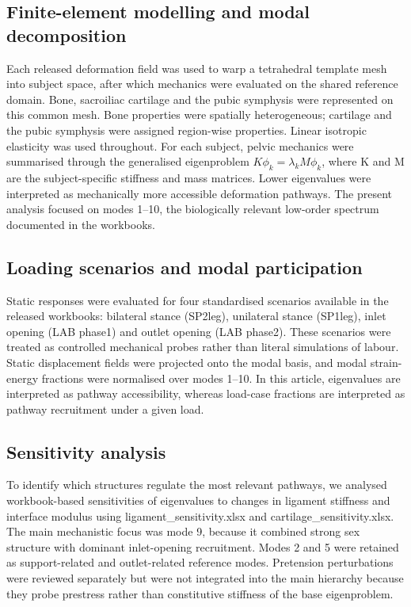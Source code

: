 \documentclass[openacc]{rsproca_new}
\begin{document}
\subsection{Finite-element modelling and modal decomposition}
Each released deformation field was used to warp a tetrahedral template mesh into subject space, after which mechanics were evaluated on the shared reference domain. Bone, sacroiliac cartilage and the pubic symphysis were represented on this common mesh. Bone properties were spatially heterogeneous; cartilage and the pubic symphysis were assigned region-wise properties. Linear isotropic elasticity was used throughout. For each subject, pelvic mechanics were summarised through the generalised eigenproblem $K\phi_k = \lambda_k M\phi_k$, where K and M are the subject-specific stiffness and mass matrices. Lower eigenvalues were interpreted as mechanically more accessible deformation pathways. The present analysis focused on modes 1--10, the biologically relevant low-order spectrum documented in the workbooks.

\subsection{Loading scenarios and modal participation}
Static responses were evaluated for four standardised scenarios available in the released workbooks: bilateral stance (SP2leg), unilateral stance (SP1leg), inlet opening (LAB phase1) and outlet opening (LAB phase2). These scenarios were treated as controlled mechanical probes rather than literal simulations of labour. Static displacement fields were projected onto the modal basis, and modal strain-energy fractions were normalised over modes 1--10. In this article, eigenvalues are interpreted as pathway accessibility, whereas load-case fractions are interpreted as pathway recruitment under a given load.

\subsection{Sensitivity analysis}
To identify which structures regulate the most relevant pathways, we analysed workbook-based sensitivities of eigenvalues to changes in ligament stiffness and interface modulus using ligament\_sensitivity.xlsx and cartilage\_sensitivity.xlsx. The main mechanistic focus was mode 9, because it combined strong sex structure with dominant inlet-opening recruitment. Modes 2 and 5 were retained as support-related and outlet-related reference modes. Pretension perturbations were reviewed separately but were not integrated into the main hierarchy because they probe prestress rather than constitutive stiffness of the base eigenproblem.
\end{document}
